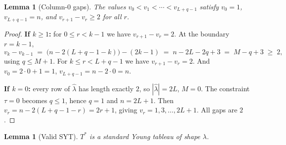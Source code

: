 \documentclass[11pt]{article}
\newtheorem{lemma}[theorem]{Lemma}
\theoremstyle{definition}
\newcommand{\hatl}{\widehat\lambda}
\begin{document}
\begin{lemma}[Column-$0$ gaps]\label{lem:gaps}
The values $v_0 < v_1 < \cdots < v_{L+q-1}$ satisfy $v_0 = 1$,
$v_{L+q-1} = n$, and $v_{r+1} - v_r \ge 2$ for all $r$.
\end{lemma}

\begin{proof}
\textbf{If $k \ge 1$:} for $0 \le r < k-1$ we have $v_{r+1} - v_r = 2$.
At the boundary $r = k-1$,
\[
   v_k - v_{k-1} \;=\; \bigl(n - 2(L+q-1-k)\bigr) - (2k-1)
   \;=\; n - 2L - 2q + 3
   \;=\; M - q + 3 \;\ge\; 2,
\]
using $q \le M + 1$.  For $k \le r < L+q-1$ we have $v_{r+1} - v_r = 2$.
And $v_0 = 2 \cdot 0 + 1 = 1$, $v_{L+q-1} = n - 2 \cdot 0 = n$.

\textbf{If $k = 0$:} every row of $\hatl$ has length exactly $2$, so
$|\hatl| = 2L$, $M = 0$.  The constraint $\tau = 0$ becomes $q \le 1$,
hence $q = 1$ and $n = 2L+1$.  Then $v_r = n - 2(L+q-1-r) = 2r+1$,
giving $v_r = 1, 3, \ldots, 2L+1$.  All gaps are $2$.
\end{proof}

\begin{lemma}[Valid SYT]\label{lem:syt}
$T^*$ is a standard Young tableau of shape $\lambda$.
\end{lemma}
\end{document}
